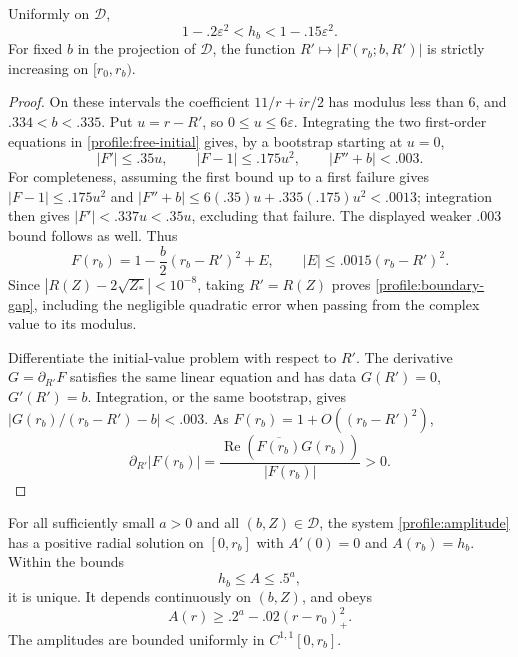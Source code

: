 \begin{lemma}\label{profile:boundary-modulus}
Uniformly on $\mathcal D$,
\begin{equation}\label{profile:boundary-gap}
 1-.2\varepsilon^2<h_b<1-.15\varepsilon^2.
\end{equation}
For fixed $b$ in the projection of $\mathcal D$, the function
$R'\mapsto|F(r_b;b,R')|$ is strictly increasing on $[r_0,r_b)$.
\end{lemma}

\begin{proof}
On these intervals the coefficient $11/r+ir/2$ has modulus less than
$6$, and $.334<b<.335$.  Put $u=r-R'$, so $0\le u\le6\varepsilon$.
Integrating the two first-order equations in \eqref{profile:free-initial}
gives, by a bootstrap starting at $u=0$,
\[
 |F'|\le .35u,\qquad |F-1|\le .175u^2,
       \qquad |F''+b|<.003.
\]
For completeness, assuming the first bound up to a first failure gives
$|F-1|\le.175u^2$ and
$|F''+b|\le6(.35)u+.335(.175)u^2<.0013$; integration then gives
$|F'|<.337u<.35u$, excluding that failure.  The displayed weaker
$.003$ bound follows as well.  Thus
\[
 F(r_b)=1-\frac b2(r_b-R')^2+E,\qquad
       |E|\le.0015(r_b-R')^2.
\]
Since $|R(Z)-2\sqrt{Z_*}|<10^{-8}$, taking $R'=R(Z)$ proves
\eqref{profile:boundary-gap}, including the negligible quadratic error
when passing from the complex value to its modulus.

Differentiate the initial-value problem with respect to $R'$.  The
derivative $G=\partial_{R'}F$ satisfies the same linear equation and has
data $G(R')=0$, $G'(R')=b$.  Integration, or the same bootstrap, gives
$|G(r_b)/(r_b-R')-b|<.003$.  As $F(r_b)=1+O((r_b-R')^2)$,
\[
 \partial_{R'}|F(r_b)|
   =\frac{\operatorname{Re}(\overline{F(r_b)}G(r_b))}{|F(r_b)|}>0.
\]
\end{proof}

\begin{lemma}\label{profile:inner}
For all sufficiently small $a>0$ and all $(b,Z)\in\mathcal D$, the
system \eqref{profile:amplitude} has a positive radial solution on
$[0,r_b]$ with $A'(0)=0$ and $A(r_b)=h_b$.  Within the bounds
\begin{equation}\label{profile:inner-bounds}
 h_b\le A\le .5^a,
\end{equation}
it is unique.  It depends continuously on $(b,Z)$, and obeys
\begin{equation}\label{profile:bulk-barrier}
 A(r)\ge .2^a-.02(r-r_0)_+^2.
\end{equation}
The amplitudes are bounded uniformly in $C^{1,1}[0,r_b]$.
\end{lemma}

